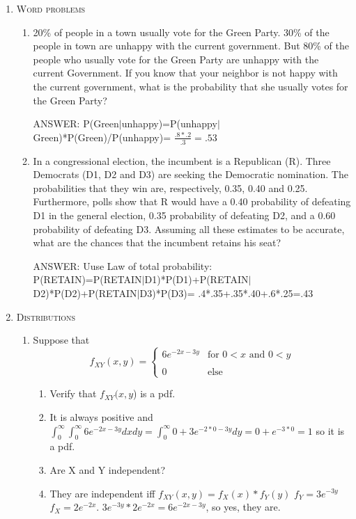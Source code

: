 \documentclass[11pt,letterpaper]{article}
\numberwithin{equation}{section}
\begin{document}
\begin{enumerate}[I]
\item \textsc{Word problems}  
\begin{enumerate}
\item 20\% of people in a town usually vote for the Green Party. 30\% of the people in town are unhappy with the current government. But 80\% of the people who usually vote for the Green Party are unhappy with the current Government. If you know that your neighbor is not happy with the current government, what is the probability that she usually votes for the Green Party?

ANSWER: P(Green$|$unhappy)=P(unhappy$|$Green)*P(Green)/P(unhappy)= $\frac{.8*.2}{.3}=.53$



\item In a congressional election, the incumbent is a Republican (R). Three Democrats (D1, D2 and D3) are seeking the Democratic nomination. The probabilities that they win are, respectively, 0.35, 0.40 and 0.25. Furthermore, polls show that R would have a 0.40 probability of defeating D1 in the general election, 0.35 probability of defeating D2, and a 0.60 probability of defeating D3. Assuming all these estimates to be accurate, what are the chances that the incumbent retains his seat?

ANSWER: Uuse Law of total probability:\\

 P(RETAIN)=P(RETAIN$|$D1)*P(D1)+P(RETAIN$|$D2)*P(D2)+P(RETAIN$|$D3)*P(D3)= .4*.35+.35*.40+.6*.25=.43
\end{enumerate}
\pagebreak
\item \textsc{Distributions} 
\begin{enumerate}

\item Suppose that 
$$f_{XY}(x,y)=\begin{cases} 6e^{-2x-3y} & \text{for } 0< x \text{ and }0<y \\ \\ 0 &\text{else}
\end{cases}$$
\begin{enumerate}[1)]
\item  Verify that $f_{XY}(x,y$) is a pdf. 
\item[A)] It is always positive and $\int_0^\infty \int_0^\infty 6e^{-2x-3y} dx dy=\int_0^\infty 0 +3e^{-2*0-3y} dy =0+ e^{-3*0}=1$ so it is a pdf.
\item Are X and Y independent?
\item[A)] They are independent iff $f_{XY}(x,y)=f_X(x)*f_Y(y)$  $f_Y= 3e^{-3y}$ $f_X=2e^{-2x}$.   $3e^{-3y}*2e^{-2x}=6e^{-2x-3y}$, so yes, they are.


\end{enumerate}
\end{enumerate}
\end{enumerate}
\end{document}
